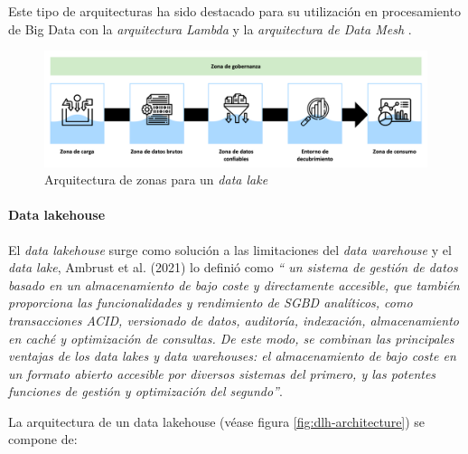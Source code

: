 Este tipo de arquitecturas ha sido destacado para su utilización en procesamiento de Big Data con la
\textit{arquitectura Lambda} \cite{kiran2015lambda} y la \textit{arquitectura de Data Mesh} \cite{machado2022data}.


\begin{figure}[h!]
    \centering
    \includegraphics[width=\textwidth]{Images/zone-architecture.png}
    \caption{Arquitectura de zonas para un \textit{data lake}}
    \label{fig:zone-architecture}
\end{figure}


\paragraph{Data lakehouse\newline}

El \textit{data lakehouse} surge como solución a las limitaciones del \textit{data warehouse} y el \textit{data lake}, 
Ambrust et al. (2021) \cite{armbrust2021lakehouse} lo definió como
\textit{`` 
un sistema de gestión de datos basado en un almacenamiento de bajo coste y directamente accesible, 
que también proporciona las funcionalidades y rendimiento de SGBD analíticos, 
como transacciones ACID, versionado de datos, auditoría, indexación, almacenamiento en caché y optimización de consultas. 
De este modo, se combinan las principales ventajas de los data lakes y data warehouses: 
el almacenamiento de bajo coste en un formato abierto accesible por diversos sistemas del primero, y las potentes funciones de gestión y optimización del segundo''}.

La arquitectura de un data lakehouse (véase figura \ref{fig:dlh-architecture}) se compone de:

